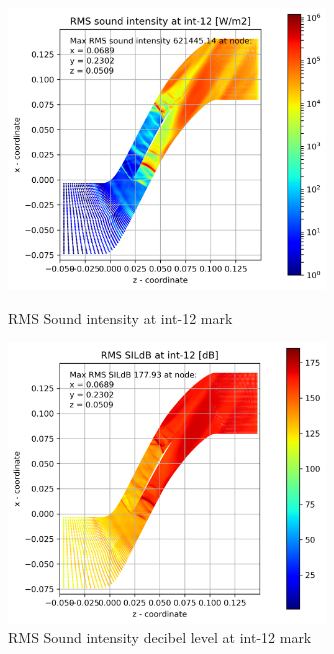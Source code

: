 \begin{figure}[ht]
  \centering
  \includegraphics[width=0.75\textwidth]{Figures/int-12-rms-sil.png} 
  \caption{RMS Sound intensity at int-12 mark} \label{int-12-rms-sil}
  
  \vspace*{\floatsep}%

  \includegraphics[width=0.75\textwidth]{Figures/int-12-rms-sildb.png} 
  \caption{RMS Sound intensity decibel level at int-12 mark} \label{int-12-rms-sildb}
\end{figure}


